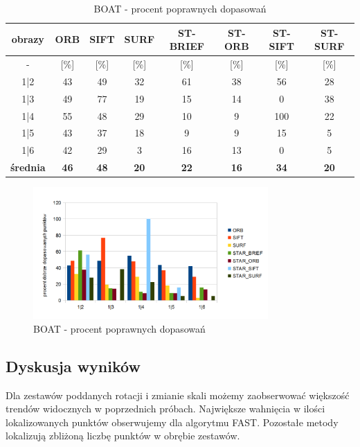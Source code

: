 \begin{table}[htbp]
  \centering
  \caption{BOAT - procent poprawnych dopasowań}
    \begin{tabular}{|c|c|c|c|c|c|c|c|}\hline
    obrazy & \textbf{ORB} & \textbf{SIFT} & \textbf{SURF} & \textbf{ST-BRIEF} & \textbf{ST-ORB} & \textbf{ST-SIFT} & \textbf{ST-SURF} \\\hline
     - & [\%] & [\%] & [\%] & [\%] & [\%] & [\%] & [\%] \\\hline
   
    1|2 & 43 & 49 & 32 & 61 & 38 & 56 & 28 \\
    1|3 & 49 & 77 & 19 & 15 & 14 & 0 & 38 \\
    1|4 & 55 & 48 & 29 & 10 & 9 & 100 & 22 \\
    1|5 & 43 & 37 & 18 & 9 & 9 & 15 & 5 \\
    1|6 & 42 & 29 & 3 & 16 & 13 & 0 & 5 \\\hline
    \textbf{średnia} & \textbf{46} & \textbf{48} & \textbf{20} & \textbf{22} & \textbf{16} & \textbf{34} & \textbf{20} \\\hline
     \end{tabular}%
  \label{tab:boat_m2}%
\end{table}%


\begin{figure}
\centering
\includegraphics[width=0.8\textwidth]{pict/mikolajczyk/boat/m2.png}
\caption{BOAT - procent poprawnych dopasowań}
\label{fig:boat_m2}
\end{figure}
\FloatBarrier
\subsection{Dyskusja wyników}
Dla zestawów poddanych rotacji i zmianie skali możemy zaobserwować większość trendów widocznych w poprzednich próbach. Największe wahnięcia w ilości lokalizowanych punktów obserwujemy dla algorytmu FAST. Pozostałe metody lokalizują zbliżoną liczbę punktów w obrębie zestawów.

